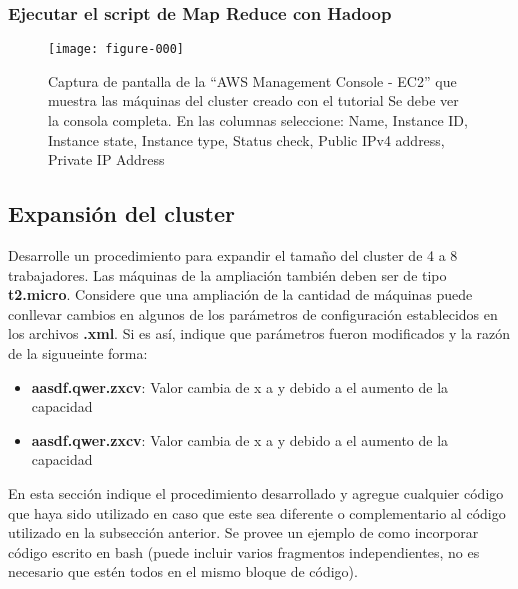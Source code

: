 \documentclass[12pt,letterpaper,twoside]{article}
\begin{document}
\subsubsection*{Ejecutar el script de Map Reduce con Hadoop}

\begin{code}[H]

\end{code}

\begin{figure}
    \centering
    \texttt{[image: figure-000]}
    \caption{Captura de pantalla de la ``AWS Management Console - EC2'' que muestra las máquinas del cluster creado con el tutorial
    {\color{red} Se debe ver la consola completa. En las columnas seleccione: Name, Instance ID, Instance state, Instance type, Status check, Public IPv4 address, Private IP Address}}
    \label{fig:001}
\end{figure}

\subsection{Expansión del cluster}

{\color{red} Desarrolle un procedimiento para expandir el tamaño del cluster de 4 a 8 trabajadores. Las máquinas de la ampliación también deben ser de tipo \textbf{t2.micro}. Considere que una ampliación de la cantidad de máquinas puede conllevar cambios en algunos de los parámetros de configuración establecidos en los archivos \textbf{.xml}. Si es así, indique que parámetros fueron modificados y la razón de la siguueinte forma:
\begin{itemize}
    \item \textbf{aasdf.qwer.zxcv}: Valor cambia de x a y debido a el aumento de la capacidad
    \item \textbf{aasdf.qwer.zxcv}: Valor cambia de x a y debido a el aumento de la capacidad
\end{itemize}
}

{\color{red} En esta sección indique el procedimiento desarrollado y agregue cualquier código que haya sido utilizado en caso que este sea diferente o complementario al código utilizado en la subsección anterior. Se provee un ejemplo de como incorporar código escrito en bash (puede incluir varios fragmentos independientes, no es necesario que estén todos en el mismo bloque de código).}
\end{document}
